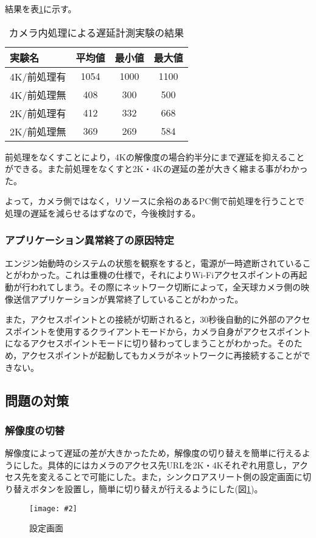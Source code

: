 \documentclass[a4paper,12pt]{jsarticle}
\newcommand{\figuref}[1]{図\ref{#1}}
\newcommand{\tabref}[1]{表\ref{#1}}
\newcommand{\fig}[4][width=\textwidth]{
    \begin{figure}[!h]
    \begin{center}
    \texttt{[image: \#2]}
    \caption{#3}
    \label{#4}
    \vspace*{-1cm}
    \end{center}
    \end{figure}
}
\begin{document}
結果を\tabref{camera_table}に示す。

\begin{table}[htb]
\begin{center}
\caption{カメラ内処理による遅延計測実験の結果}
\label{camera_table}
\begin{tabular}{l|c|c|c}
実験名 & 平均値 & 最小値 & 最大値 \\ \hline
4K/前処理有 & 1054 & 1000 & 1100 \\
4K/前処理無 & 408 & 300 & 500 \\
2K/前処理有 & 412 & 332 & 668 \\
2K/前処理無 & 369 & 269 & 584 \\
\end{tabular}
\end{center}
\end{table}

前処理をなくすことにより，4Kの解像度の場合約半分にまで遅延を抑えることができる。また前処理をなくすと2K・4Kの遅延の差が大きく縮まる事がわかった。

よって，カメラ側ではなく，リソースに余裕のあるPC側で前処理を行うことで処理の遅延を減らせるはずなので，今後検討する。

\subsubsection{アプリケーション異常終了の原因特定}
エンジン始動時のシステムの状態を観察をすると，電源が一時遮断されていることがわかった。これは重機の仕様で，それによりWi-Fiアクセスポイントの再起動が行われてしまう。その際にネットワーク切断によって，全天球カメラ側の映像送信アプリケーションが異常終了していることがわかった。

また，アクセスポイントとの接続が切断されると，30秒後自動的に外部のアクセスポイントを使用するクライアントモードから，カメラ自身がアクセスポイントになるアクセスポイントモードに切り替わってしまうことがわかった。そのため，アクセスポイントが起動してもカメラがネットワークに再接続することができない。
\clearpage

\subsection{問題の対策}
\subsubsection{解像度の切替}
解像度によって遅延の差が大きかったため，解像度の切り替えを簡単に行えるようにした。具体的にはカメラのアクセス先URLを2K・4Kそれぞれ用意し，アクセス先を変えることで可能にした。また，シンクロアスリート側の設定画面に切り替えボタンを設置し，簡単に切り替えが行えるようにした(\figuref{setting})。
\fig[width=7cm]{image/setting.png}{設定画面}{setting}
\end{document}
